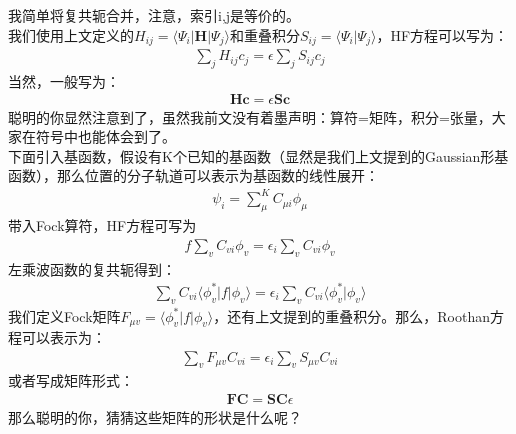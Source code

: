 \documentclass[12pt, a4paper, oneside]{ctexart}
\begin{document}
我简单将复共轭合并，注意，索引i,j是等价的。\\
我们使用上文定义的$H_{ij}=\langle\Psi_i|\mathbf{H}|\Psi_j\rangle$和重叠积分$S_{ij}=\langle\Psi_i|\Psi_j\rangle$，HF方程可以写为：
\begin{equation}
\begin{aligned}
\sum_jH_{ij}c_j=\epsilon\sum_jS_{ij}c_j
\end{aligned}
\end{equation}
当然，一般写为：
\begin{equation}
\begin{aligned}
\mathbf{Hc}=\epsilon\mathbf{Sc}
\end{aligned}
\end{equation}
聪明的你显然注意到了，虽然我前文没有着墨声明：算符=矩阵，积分=张量，大家在符号中也能体会到了。\\
下面引入基函数，假设有K个已知的基函数（显然是我们上文提到的Gaussian形基函数），那么位置的分子轨道可以表示为基函数的线性展开：
\begin{equation}
\begin{aligned}
\psi_i=\sum_{\mu}^KC_{\mu i}\phi_{\mu}
\end{aligned}
\end{equation}
带入Fock算符，HF方程可写为
\begin{equation}
\begin{aligned}
f\sum_vC_{vi}\phi_v=\epsilon_i\sum_vC_{vi}\phi_v
\end{aligned}
\end{equation}
左乘波函数的复共轭得到：
\begin{equation}
\begin{aligned}
\sum_vC_{vi}\langle\phi_v^*|f|\phi_v\rangle=\epsilon_i\sum_vC_{vi}\langle\phi_v^*|\phi_v\rangle
\end{aligned}
\end{equation}
我们定义Fock矩阵$F_{\mu v}=\langle\phi_v^*|f|\phi_v\rangle$，还有上文提到的重叠积分。那么，Roothan方程可以表示为：
\begin{equation}
\begin{aligned}
\sum_vF_{\mu v}C_{vi}=\epsilon_i\sum_vS_{\mu v}C_{vi}
\end{aligned}
\end{equation}
或者写成矩阵形式：
\begin{equation}
\begin{aligned}
\mathbf{FC}=\mathbf{SC}\epsilon
\end{aligned}
\end{equation}
那么聪明的你，猜猜这些矩阵的形状是什么呢？\par
\end{document}
